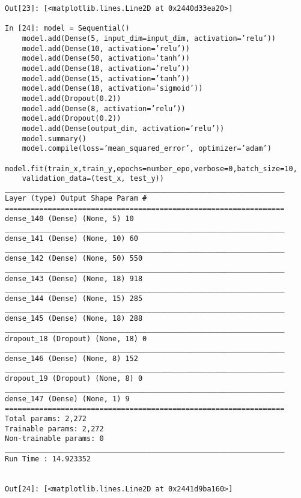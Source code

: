 \documentclass[10pt]{article}
\begin{document}
\begin{verbatim}
Out[23]: [<matplotlib.lines.Line2D at 0x2440d33ea20>]

In [24]: model = Sequential()
    model.add(Dense(5, input_dim=input_dim, activation=’relu’))
    model.add(Dense(10, activation=’relu’))
    model.add(Dense(50, activation=’tanh’))
    model.add(Dense(18, activation=’relu’))
    model.add(Dense(15, activation=’tanh’))
    model.add(Dense(18, activation=’sigmoid’))
    model.add(Dropout(0.2))
    model.add(Dense(8, activation=’relu’))
    model.add(Dropout(0.2))
    model.add(Dense(output_dim, activation=’relu’))
    model.summary()
    model.compile(loss=’mean_squared_error’, optimizer=’adam’)
    model.fit(train_x,train_y,epochs=number_epo,verbose=0,batch_size=10,
    validation_data=(test_x, test_y))
_________________________________________________________________
Layer (type) Output Shape Param #
=================================================================
dense_140 (Dense) (None, 5) 10
_________________________________________________________________
dense_141 (Dense) (None, 10) 60
_________________________________________________________________
dense_142 (Dense) (None, 50) 550
_________________________________________________________________
dense_143 (Dense) (None, 18) 918
_________________________________________________________________
dense_144 (Dense) (None, 15) 285
_________________________________________________________________
dense_145 (Dense) (None, 18) 288
_________________________________________________________________
dropout_18 (Dropout) (None, 18) 0
_________________________________________________________________
dense_146 (Dense) (None, 8) 152
_________________________________________________________________
dropout_19 (Dropout) (None, 8) 0
_________________________________________________________________
dense_147 (Dense) (None, 1) 9
=================================================================
Total params: 2,272
Trainable params: 2,272
Non-trainable params: 0
_________________________________________________________________
Run Time : 14.923352


Out[24]: [<matplotlib.lines.Line2D at 0x2441d9ba160>]


\end{verbatim}
\end{document}
